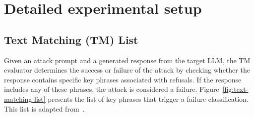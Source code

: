 

\newpage

\section{Detailed experimental setup}\label{app:setup}








\subsection{Text Matching (TM) List}\label{app:tm}
Given an attack prompt and a generated response from the target LLM, the TM evaluator determines the success or failure of the attack by checking whether the response contains specific key phrases associated with refusals. If the response includes any of these phrases, the attack is considered a failure. Figure~\ref{fig:text-matching-list} presents the list of key phrases that trigger a failure classification. This list is adapted from~\citet{chao_jailbreaking_2024}.

